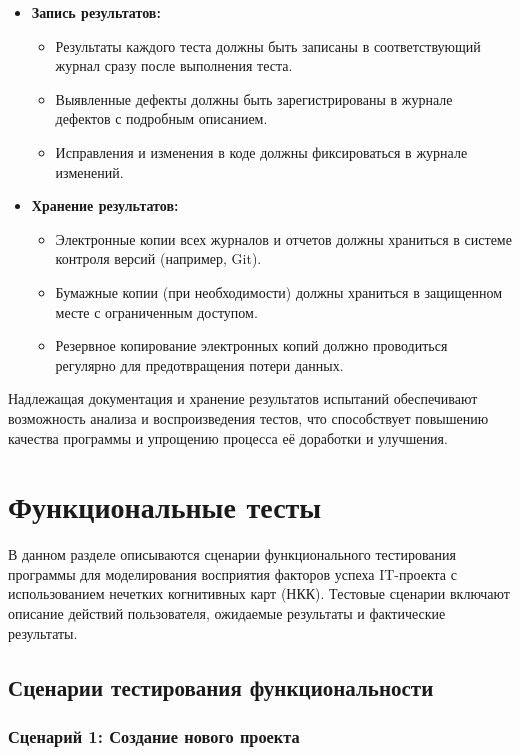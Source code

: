 \documentclass{article}
\begin{document}
    \begin{itemize}
        \item \textbf{Запись результатов:}
        \begin{itemize}
            \item Результаты каждого теста должны быть записаны в соответствующий журнал сразу после выполнения теста.
            \item Выявленные дефекты должны быть зарегистрированы в журнале дефектов с подробным описанием.
            \item Исправления и изменения в коде должны фиксироваться в журнале изменений.
        \end{itemize}
        \item \textbf{Хранение результатов:}
        \begin{itemize}
            \item Электронные копии всех журналов и отчетов должны храниться в системе контроля версий (например, Git).
            \item Бумажные копии (при необходимости) должны храниться в защищенном месте с ограниченным доступом.
            \item Резервное копирование электронных копий должно проводиться регулярно для предотвращения потери данных.
        \end{itemize}
    \end{itemize}

    Надлежащая документация и хранение результатов испытаний обеспечивают возможность анализа и воспроизведения тестов, что способствует повышению качества программы и упрощению процесса её доработки и улучшения.
    \newpage
    \section{Функциональные тесты}
    В данном разделе описываются сценарии функционального тестирования программы для моделирования восприятия факторов успеха IT-проекта с использованием нечетких когнитивных карт (НКК). Тестовые сценарии включают описание действий пользователя, ожидаемые результаты и фактические результаты.

    \subsection{Сценарии тестирования функциональности}

    \subsubsection{Сценарий 1: Создание нового проекта}
\end{document}
